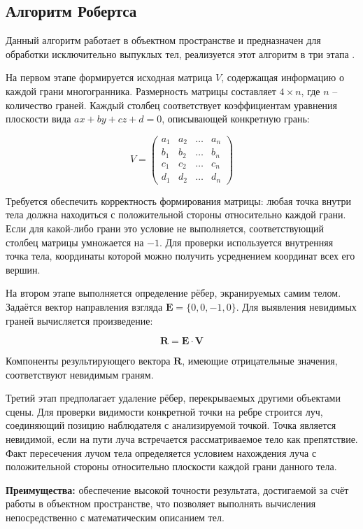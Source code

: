\subsection{Алгоритм Робертса}

Данный алгоритм работает в объектном пространстве и предназначен для обработки исключительно выпуклых тел, реализуется этот алгоритм в три этапа \cite{rogers_base}. 

На первом этапе формируется исходная матрица $V$, содержащая информацию о каждой грани многогранника. Размерность матрицы составляет $4 \times n$, где $n$ -- количество граней. Каждый столбец соответствует коэффициентам уравнения плоскости вида $ax + by + cz + d = 0$, описывающей конкретную грань:

\[
V = \begin{pmatrix}
	a_1 & a_2 & \dots & a_n \\
	b_1 & b_2 & \dots & b_n \\
	c_1 & c_2 & \dots & c_n \\
	d_1 & d_2 & \dots & d_n
\end{pmatrix}
\tag{1}
\]

Требуется обеспечить корректность формирования матрицы: любая точка внутри тела должна находиться с положительной стороны относительно каждой грани. Если для какой-либо грани это условие не выполняется, соответствующий столбец матрицы умножается на $-1$. Для проверки используется внутренняя точка тела, координаты которой можно получить усреднением координат всех его вершин.

На втором этапе выполняется определение рёбер, экранируемых самим телом. Задаётся вектор направления взгляда $\mathbf{E} = \{0, 0, -1, 0\}$. Для выявления невидимых граней вычисляется произведение:

\[
\mathbf{R} = \mathbf{E} \cdot \mathbf{V}
\]

Компоненты результирующего вектора $\mathbf{R}$, имеющие отрицательные значения, соответствуют невидимым граням.

Третий этап предполагает удаление рёбер, перекрываемых другими объектами сцены. Для проверки видимости конкретной точки на ребре строится луч, соединяющий позицию наблюдателя с анализируемой точкой. Точка является невидимой, если на пути луча встречается рассматриваемое тело как препятствие. Факт пересечения лучом тела определяется условием нахождения луча с положительной стороны относительно плоскости каждой грани данного тела.


\textbf{Преимущества:} обеспечение высокой точности результата, достигаемой за счёт работы в объектном пространстве, что позволяет выполнять вычисления непосредственно с математическим описанием тел.

